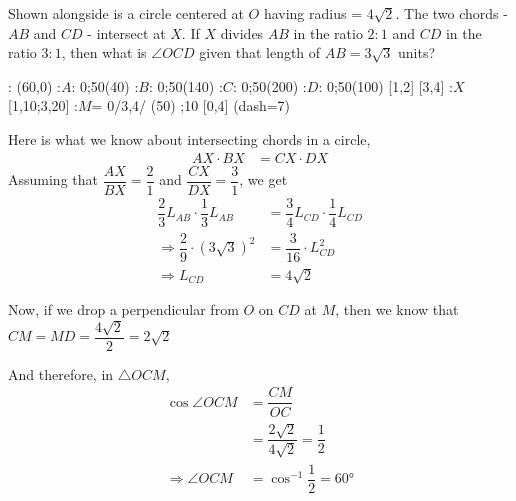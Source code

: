 

\question[6]  Shown alongside is a circle centered at $O$ having radius = $4\sqrt2$.
The two chords - $AB$ and $CD$ - intersect at $X$. If $X$ divides $AB$ in the ratio $2:1$
and $CD$ in the ratio $3:1$, then what is $\angle OCD$ given that length of $AB = 3\sqrt3$ units?

  : (60,0)
  :$A$: 0;50(40)
  :$B$: 0;50(140)
  :$C$: 0;50(200)
  :$D$: 0;50(100)
   [1,2]
   [3,4]
  :$X$[1,10;3,20]
  :$M$= 0/3,4/
\figdrawbegin{}
  (50)
  \figdrawline [1,2]
  \figdrawline [3,4]
  ;10 [0,4]
  \figset (dash=7)
  \figdrawline [0,3]
  \ifprintanswers
    \figdrawline [0,6]
  \fi
\figdrawend
{}

\ifprintanswers
  \begin{marginfigure}
    \centerline{\box\figBoxA}
  \end{marginfigure}
\else
  \vspace{1cm}
  \centerline{\box\figBoxA}
\fi

\begin{solution}[\fullpage]
	Here is what we know about intersecting chords in a circle,
	\begin{align}
		AX\cdot BX &= CX\cdot DX
	\end{align}
	Assuming that $\dfrac{AX}{BX} = \dfrac{2}{1}$ and $\dfrac{CX}{DX} = \dfrac{3}{1}$, we get
	\begin{align}
		\dfrac{2}{3}L_{AB}\cdot\dfrac{1}{3}L_{AB} &= \dfrac{3}{4}L_{CD}\cdot\dfrac{1}{4}L_{CD} \\
		\Rightarrow \dfrac{2}{9}\cdot(3\sqrt{3})^2 &= \dfrac{3}{16}\cdot L_{CD}^2 \\
		\Rightarrow L_{CD} &= 4\sqrt{2}
	\end{align}
	
	Now, if we drop a perpendicular from $O$ on $CD$ at $M$, then we know that 
	$CM = MD = \dfrac{4\sqrt2}{2} = 2\sqrt{2}$
	
	And therefore, in $\triangle OCM$, 
	\begin{align}
		\cos\angle OCM &= \dfrac{CM}{OC} \\
		               &= \dfrac{2\sqrt{2}}{4\sqrt{2}} = \dfrac{1}{2} \\
		\Rightarrow \angle OCM &= \cos^{-1}\dfrac{1}{2} = \ang{60}
	\end{align}
\end{solution}
